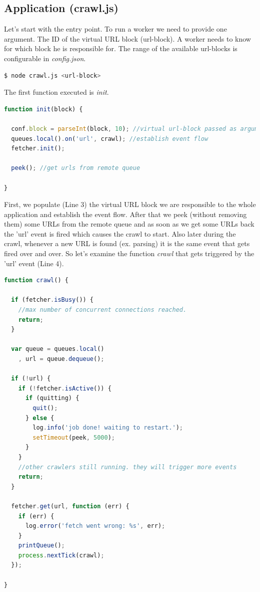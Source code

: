 \subsection{Application (crawl.js)}
Let's start with the entry point. To run a worker we need to provide one argument. The ID of the virtual URL block (url-block). A worker needs to know for which block he is responsible for. The range of the available url-blocks is configurable in \emph{config.json}.

\begin{lstlisting}[language=sh]
$ node crawl.js <url-block>
\end{lstlisting}

The first function executed is \emph{init}.

\begin{lstlisting}[language=JavaScript]
function init(block) {

  conf.block = parseInt(block, 10); //virtual url-block passed as argument on startup
  queues.local().on('url', crawl); //establish event flow
  fetcher.init();

  peek(); //get urls from remote queue

}
\end{lstlisting}

First, we populate (Line 3) the virtual URL block we are responsible to the whole application and establish the event flow. After that we peek (without removing them) some URLs from the remote queue and as soon as we get some URLs back the 'url' event is fired which causes the crawl to start. Also later during the crawl, whenever a new URL is found (ex. parsing) it is the same event that gets fired over and over. So let's examine the function \emph{crawl} that gets triggered by the 'url' event (Line 4).

\begin{lstlisting}[language=JavaScript]
function crawl() {

  if (fetcher.isBusy()) {
    //max number of concurrent connections reached.
    return;
  }

  var queue = queues.local()
    , url = queue.dequeue();

  if (!url) {
    if (!fetcher.isActive()) {
      if (quitting) {
        quit();
      } else {
        log.info('job done! waiting to restart.');
        setTimeout(peek, 5000);
      }
    }
    //other crawlers still running. they will trigger more events
    return;
  }

  fetcher.get(url, function (err) {
    if (err) {
      log.error('fetch went wrong: %s', err);
    }
    printQueue();
    process.nextTick(crawl);
  });

}
\end{lstlisting}

